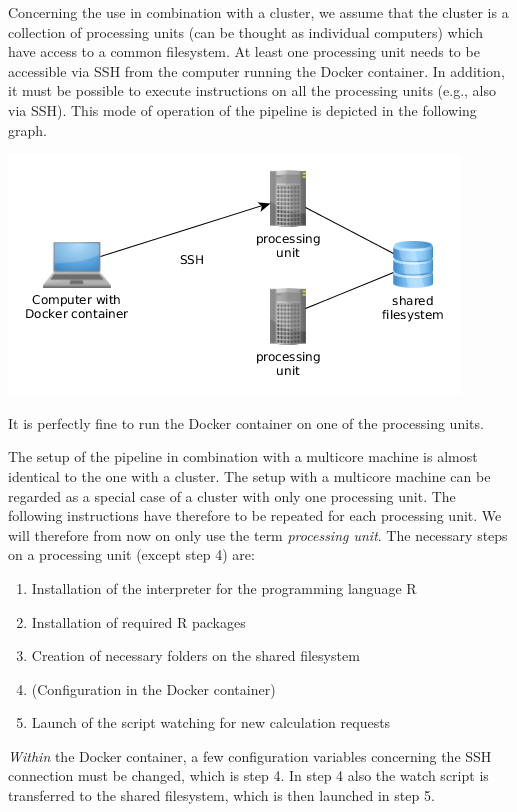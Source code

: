 \documentclass[12pt,a4paper]{scrartcl}
\begin{document}
 Concerning the use in combination with a cluster, we assume that the cluster is a collection of processing units (can be thought as individual computers) which have access to a common filesystem.
 At least one processing unit needs to be accessible via SSH from the computer running the Docker container.
 In addition, it must be possible to execute instructions on all the processing units (e.g., also via SSH). 
 This mode of operation of the pipeline is depicted in the following graph.
 \begin{center}
 \includegraphics[scale=0.6]{graphs/cluster_config.png}
 \end{center}
 It is perfectly fine to run the Docker container on one of the processing units.
 
 The setup of the pipeline in combination with a multicore machine is almost identical to the one with a cluster.
 The setup with a multicore machine can be regarded as a special case of a cluster with only one processing unit.
 The following instructions have therefore to be repeated for each processing unit.
 We will therefore from now on only use the term \textit{processing unit}.
 The necessary steps on a processing unit (except step 4) are:
 \begin{enumerate}
  \item Installation of the interpreter for the programming language R
  \item Installation of required R packages
  \item Creation of necessary folders on the shared filesystem
  \item (Configuration in the Docker container)
  \item Launch of the script watching for new calculation requests 
 \end{enumerate}
 \textit{Within} the Docker container, a few configuration variables concerning the SSH connection must be changed, which is step 4.
 In step 4 also the watch script is transferred to the shared filesystem, which is then launched in step 5.
\end{document}
